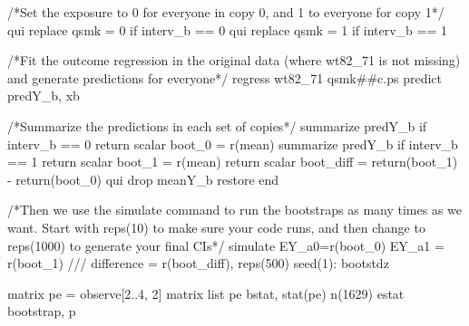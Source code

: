\documentclass[
  10pt,
  a4paper,
]{book}
\newenvironment{Shaded}{\begin{snugshade}}{\end{snugshade}}
\newcommand{\CommentTok}[1]{\textcolor[rgb]{0.37,0.37,0.37}{#1}}
\newcommand{\DecValTok}[1]{\textcolor[rgb]{0.68,0.00,0.00}{#1}}
\newcommand{\FunctionTok}[1]{\textcolor[rgb]{0.28,0.35,0.67}{#1}}
\newcommand{\KeywordTok}[1]{\textcolor[rgb]{0.00,0.46,0.62}{#1}}
\newcommand{\NormalTok}[1]{\textcolor[rgb]{0.00,0.46,0.62}{#1}}
\newcommand{\OtherTok}[1]{\textcolor[rgb]{0.00,0.46,0.62}{#1}}
\begin{document}
\begin{Shaded}
\begin{Highlighting}[]
\CommentTok{/*Set the exposure to 0 for everyone in copy 0, }
\CommentTok{and 1 to everyone for copy 1*/}
\KeywordTok{qui} \KeywordTok{replace}\NormalTok{ qsmk = 0 }\KeywordTok{if}\NormalTok{ interv\_b == 0}
\KeywordTok{qui} \KeywordTok{replace}\NormalTok{ qsmk = 1 }\KeywordTok{if}\NormalTok{ interv\_b == 1}

\CommentTok{/*Fit the outcome regression in the original data }
\CommentTok{(where wt82\_71 is not missing) and }
\CommentTok{generate predictions for everyone*/}
\KeywordTok{regress}\NormalTok{ wt82\_71 qsmk\#\#c.ps}
\KeywordTok{predict}\NormalTok{ predY\_b, }\KeywordTok{xb}

\CommentTok{/*Summarize the predictions in each set of copies*/}
\KeywordTok{summarize}\NormalTok{ predY\_b }\KeywordTok{if}\NormalTok{ interv\_b == 0}
\FunctionTok{return} \FunctionTok{scalar}\NormalTok{ boot\_0 = }\FunctionTok{r}\NormalTok{(}\KeywordTok{mean}\NormalTok{)}
\KeywordTok{summarize}\NormalTok{ predY\_b }\KeywordTok{if}\NormalTok{ interv\_b == 1}
\FunctionTok{return} \FunctionTok{scalar}\NormalTok{ boot\_1 = }\FunctionTok{r}\NormalTok{(}\KeywordTok{mean}\NormalTok{)}
\FunctionTok{return} \FunctionTok{scalar}\NormalTok{ boot\_diff = }\FunctionTok{return}\NormalTok{(boot\_1) {-} }\FunctionTok{return}\NormalTok{(boot\_0)}
\KeywordTok{qui} \KeywordTok{drop}\NormalTok{ meanY\_b}
\KeywordTok{restore}
\KeywordTok{end}

\CommentTok{/*Then we use the \textasciigrave{}simulate\textasciigrave{} command to run the bootstraps }
\CommentTok{as many times as we want.}
\CommentTok{Start with reps(10) to make sure your code runs, }
\CommentTok{and then change to reps(1000) to generate your final CIs*/}
\KeywordTok{simulate}\NormalTok{ EY\_a0=}\FunctionTok{r}\NormalTok{(boot\_0) EY\_a1 = }\FunctionTok{r}\NormalTok{(boot\_1) }\CommentTok{///}
\NormalTok{  difference = }\FunctionTok{r}\NormalTok{(boot\_diff), reps(500) }\DecValTok{seed}\NormalTok{(1): bootstdz}

\FunctionTok{matrix}\NormalTok{ pe = observe[2..4, 2]\textquotesingle{}}
\FunctionTok{matrix} \OtherTok{list}\NormalTok{ pe}
\KeywordTok{bstat}\NormalTok{, stat(pe) n(1629) }
\KeywordTok{estat} \KeywordTok{bootstrap}\NormalTok{, }\KeywordTok{p}
\end{Highlighting}
\end{Shaded}
\end{document}
